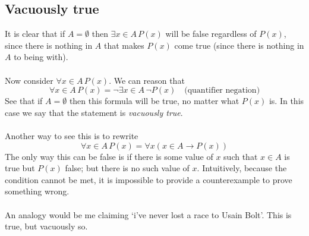 \documentclass{report}
\theoremstyle{definition}
\begin{document}
\subsection{Vacuously true}
It is clear that if $A=\emptyset$ then $\exists x\in A\,P(x)$ will be false regardless of $P(x)$, since there is nothing in $A$ that makes $P(x)$ come true 
(since there is nothing in $A$ to being with).\\
\vspace{1mm}\\
Now consider $\forall x\in A\,P(x)$. We can reason that
\begin{equation*}
\forall x\in A\,P(x)=\neg\exists x\in A\,\neg P(x)\quad\text{(quantifier negation)}
\end{equation*}
See that if $A=\emptyset$ then this formula will be true, no matter what $P(x)$ is. In this case we say that the statement is \textit{vacuously true}.\\
\vspace{1mm}\\
Another way to see this is to rewrite
\begin{equation*}
\forall x\in A\,P(x)=\forall x(x\in A\to P(x))
\end{equation*}
The only way this can be false is if there is some value of $x$ such that $x\in A$ is true but $P(x)$ false; but there is no such value of $x$.
Intuitively, because the condition cannot be met, it is impossible to provide a counterexample to prove something wrong.\\
\vspace{1mm}\\
An analogy would be me claiming `i've never lost a race to Usain Bolt'. This is true, but vacuously so.
\newpage
\end{document}
